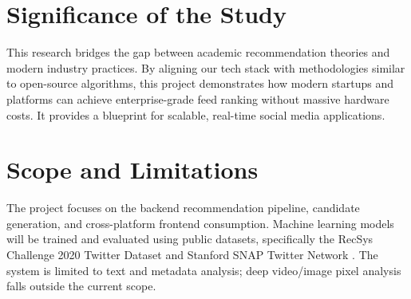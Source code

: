 \section{Significance of the Study}
This research bridges the gap between academic recommendation theories and modern industry practices. By aligning our tech stack with methodologies similar to open-source algorithms, this project demonstrates how modern startups and platforms can achieve enterprise-grade feed ranking without massive hardware costs. It provides a blueprint for scalable, real-time social media applications.

\section{Scope and Limitations}
The project focuses on the backend recommendation pipeline, candidate generation, and cross-platform frontend consumption. Machine learning models will be trained and evaluated using public datasets, specifically the RecSys Challenge 2020 Twitter Dataset \cite{recsys2020} and Stanford SNAP Twitter Network \cite{snap2014}. The system is limited to text and metadata analysis; deep video/image pixel analysis falls outside the current scope.
